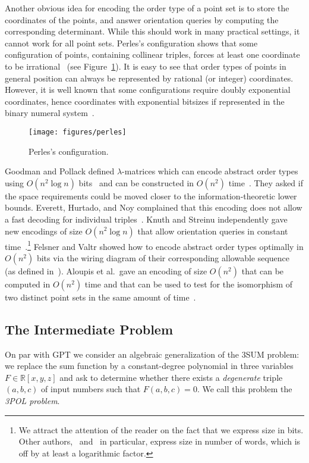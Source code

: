 Another obvious idea for encoding the order type of a point set is to store
the coordinates of the points, and answer orientation queries
by computing the corresponding determinant. While this should work in many practical
settings, it cannot work for all point sets. Perles's configuration shows that
some configuration of points, containing collinear triples, forces at least one
coordinate to be irrational~\cite{Gr05} (see Figure~\ref{fig:perles}).
%
It is easy to see that
order types of points in general position can always be represented by rational
(or integer) coordinates.
%
However, it is well known that some configurations require doubly
exponential coordinates, hence coordinates with exponential bitsizes if
represented in the binary numeral system~\cite{GPS89}.

\begin{figure}
	\centering{}
	\texttt{[image: figures/perles]}
	\caption{Perles's configuration.}\label{fig:perles}
\end{figure}

Goodman and Pollack defined \(\lambda\)-matrices which can encode abstract order
types using \( O(n^2 \log{n}) \) bits~\cite{GP83} and can be constructed in
\(O(n^2)\) time~\cite{EOS86}. They asked if the space
requirements could be moved closer to the information-theoretic lower bounds.
Everett, Hurtado, and Noy complained that this encoding does not
allow a fast decoding for individual triples~\cite{EHN99}.
Knuth and Streinu independently gave new encodings of size \(O(n^2 \log n)\)
that allow orientation queries in constant time~\cite{Knu92,St97}.\footnote{%
We attract the attention of the reader on the fact that we express size in
bits.
Other authors,~\cite{EHN99} and~\cite{St97} in particular,
express size in number of words, which is off by at least a logarithmic factor.}
Felsner and Valtr showed how to encode abstract order types optimally in
\(O(n^2)\) bits via the wiring diagram of their corresponding allowable
sequence~\cite{Fe96, FV11} (as defined in~\cite{Go80}). Aloupis et al.\ gave
an encoding of size \(O(n^2)\) that can be computed in \(O(n^2)\) time and that
can be used to test for the isomorphism of two distinct point sets in the same
amount of time~\cite{AILOW14}.

\subsection{The Intermediate Problem}
\label{sec:problem:pol:3pol}

On par with GPT we consider an algebraic generalization of the 3SUM problem:
we replace the sum function by a constant-degree polynomial in three variables
$F \in \mathbb{R}[x,y,z]$ and ask to determine whether there exists a
\emph{degenerate} triple $(a,b,c)$ of input numbers such that $F(a,b,c)=0$. We
call this problem the \emph{3POL problem}.
%


